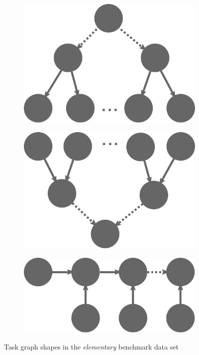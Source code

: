 \begin{figure}[h]
\begin{subfigure}{.2\textwidth}
        \includegraphics[width=.8\linewidth]{imgs/estee/shapes/splitters}
        \caption{}
        \label{fig:tg-splitters}
    \end{subfigure}
    \begin{subfigure}{.2\textwidth}
        \centering
        \includegraphics[width=.8\linewidth]{imgs/estee/shapes/conflux}
        \caption{}
        \label{fig:tg-conflux}
    \end{subfigure}
    \begin{subfigure}{.2\textwidth}
        \centering
        \includegraphics[width=.8\linewidth]{imgs/estee/shapes/fern}
        \caption{}
        \label{fig:tg-fern}
    \end{subfigure}

    \caption{Task graph shapes in the \emph{elementary} \estee{} benchmark data set}
    \label{fig:estee-elementary-shapes}
\end{figure}

